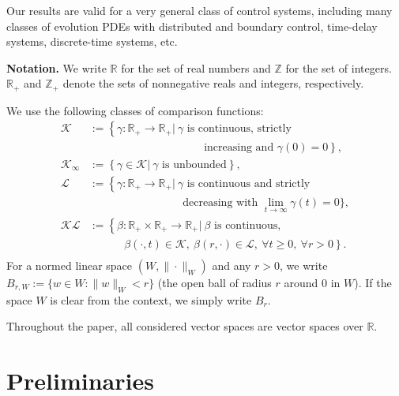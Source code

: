 \documentclass[twocolumn]{IEEEtran} %
\theoremstyle{definition}
\newcommand{\R}{\mathbb{R}}%
\newcommand{\K}{\mathcal{K}}%
\newcommand{\KL}{\mathcal{KL}}%
\newcommand{\LL}{\mathcal{L}}%
\newcommand{\Z}{\mathbb{Z}}%
\begin{document}
Our results are valid for a very general class of control systems, including many classes of evolution PDEs with distributed and boundary control, time-delay systems, discrete-time systems, etc.

\textbf{Notation.} 
We write $\R$ for the set of real numbers and $\Z$ for the set of integers. $\R_+$ and $\Z_+$ denote the sets of nonnegative reals and integers, respectively.%

We use the following classes of comparison functions:
{\allowdisplaybreaks
\begin{equation*}
\begin{array}{ll}
{\K} &:= \left\{\gamma:\R_+\rightarrow\R_+\left|\ \gamma\mbox{ is continuous, strictly} \right. \right. \\
&\phantom{aaaaaaaaaaaaaaaaaaa}\left. \mbox{ increasing and } \gamma(0)=0 \right\}, \\
{\K_{\infty}}&:=\left\{\gamma\in\K\left|\ \gamma\mbox{ is unbounded}\right.\right\},\\
{\LL}&:=\left\{\gamma:\R_+\rightarrow\R_+\left|\ \gamma\mbox{ is continuous and strictly}\right.\right.\\
&\phantom{aaaaaaaaaaaaaaaa} \text{decreasing with } \lim\limits_{t\rightarrow\infty}\gamma(t)=0\},\\
{\KL} &:= \left\{\beta:\R_+\times\R_+\rightarrow\R_+\left|\ \beta \mbox{ is continuous,}\right.\right.\\
&\phantom{aaaaaa}\left.\beta(\cdot,t)\in{\K},\ \beta(r,\cdot)\in {\LL},\ \forall t\geq 0,\ \forall r >0\right\}. \\
\end{array}
\end{equation*}
}
For a normed linear space $(W,\|\cdot\|_W)$ and any $r>0$, we write $B_{r,W} :=\{w \in W: \|w\|_W < r\}$ (the open ball of radius $r$ around $0$ in $W$). If the space $W$ is clear from the context, we simply write $B_r$.%

Throughout the paper, all considered vector spaces are vector spaces over $\R$.%





\section{Preliminaries}
\end{document}
